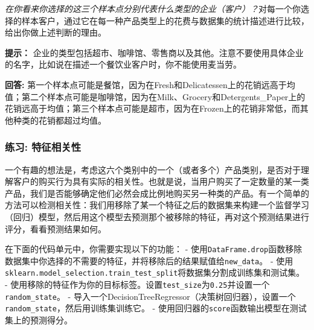 \documentclass[11pt]{article}
\begin{document}
\emph{在你看来你选择的这三个样本点分别代表什么类型的企业（客户）？}对每一个你选择的样本客户，通过它在每一种产品类型上的花费与数据集的统计描述进行比较，给出你做上述判断的理由。

\textbf{提示：}
企业的类型包括超市、咖啡馆、零售商以及其他。注意不要使用具体企业的名字，比如说在描述一个餐饮业客户时，你不能使用麦当劳。

    \textbf{回答:}
第一个样本点可能是餐馆，因为在Fresh和Delicatessen上的花销远高于均值；第二个样本点可能是咖啡馆，因为在Milk、Grocery和Detergents\_Paper上的花销远高于均值；第三个样本点可能是超市，因为在Frozen上的花销非常低，而其他种类的花销都超过均值。

    \hypertarget{ux7ec3ux4e60-ux7279ux5f81ux76f8ux5173ux6027}{%
\subsubsection{练习:
特征相关性}\label{ux7ec3ux4e60-ux7279ux5f81ux76f8ux5173ux6027}}

一个有趣的想法是，考虑这六个类别中的一个（或者多个）产品类别，是否对于理解客户的购买行为具有实际的相关性。也就是说，当用户购买了一定数量的某一类产品，我们是否能够确定他们必然会成比例地购买另一种类的产品。有一个简单的方法可以检测相关性：我们用移除了某一个特征之后的数据集来构建一个监督学习（回归）模型，然后用这个模型去预测那个被移除的特征，再对这个预测结果进行评分，看看预测结果如何。

在下面的代码单元中，你需要实现以下的功能： -
使用\texttt{DataFrame.drop}函数移除数据集中你选择的不需要的特征，并将移除后的结果赋值给\texttt{new\_data}。
-
使用\texttt{sklearn.model\_selection.train\_test\_split}将数据集分割成训练集和测试集。
-
使用移除的特征作为你的目标标签。设置\texttt{test\_size}为\texttt{0.25}并设置一个\texttt{random\_state}。
-
导入一个DecisionTreeRegressor（决策树回归器），设置一个\texttt{random\_state}，然后用训练集训练它。
- 使用回归器的\texttt{score}函数输出模型在测试集上的预测得分。
\end{document}
